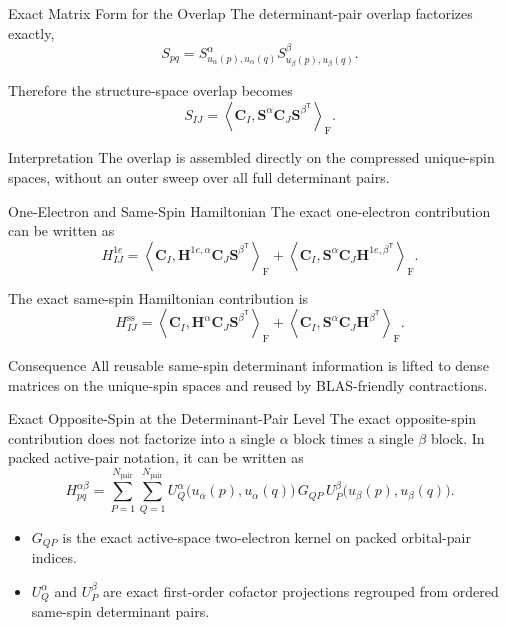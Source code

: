 \documentclass{beamer}
\newcommand{\Frob}[2]{\left\langle #1, #2 \right\rangle_{\mathrm F}}
\newcommand{\Npair}{N_{\mathrm{pair}}}
\newcommand{\Cmat}{\mathbf{C}}
\newcommand{\Sa}{\mathbf{S}^{\alpha}}
\newcommand{\Sb}{\mathbf{S}^{\beta}}
\newcommand{\Ha}{\mathbf{H}^{\alpha}}
\newcommand{\Hb}{\mathbf{H}^{\beta}}
\newcommand{\Honea}{\mathbf{H}^{1e,\alpha}}
\newcommand{\Honeb}{\mathbf{H}^{1e,\beta}}
\begin{document}
\begin{frame}{Exact Matrix Form for the Overlap}
  The determinant-pair overlap factorizes exactly,
  \[
  S_{pq}
  =
  S^{\alpha}_{u_{\alpha}(p),u_{\alpha}(q)}
  S^{\beta}_{u_{\beta}(p),u_{\beta}(q)}.
  \]

  Therefore the structure-space overlap becomes
  \[
  S_{IJ}
  =
  \Frob{\Cmat_I}{\Sa \Cmat_J \Sb^{\mathsf T}}.
  \]

  \begin{block}{Interpretation}
    The overlap is assembled directly on the compressed unique-spin spaces,
    without an outer sweep over all full determinant pairs.
  \end{block}
\end{frame}

\begin{frame}{One-Electron and Same-Spin Hamiltonian}
  The exact one-electron contribution can be written as
  \[
  H^{1e}_{IJ}
  =
  \Frob{\Cmat_I}{\Honea \Cmat_J \Sb^{\mathsf T}}
  +
  \Frob{\Cmat_I}{\Sa \Cmat_J \Honeb^{\mathsf T}}.
  \]

  The exact same-spin Hamiltonian contribution is
  \[
  H^{\mathrm{ss}}_{IJ}
  =
  \Frob{\Cmat_I}{\Ha \Cmat_J \Sb^{\mathsf T}}
  +
  \Frob{\Cmat_I}{\Sa \Cmat_J \Hb^{\mathsf T}}.
  \]

  \begin{block}{Consequence}
    All reusable same-spin determinant information is lifted to dense matrices
    on the unique-spin spaces and reused by BLAS-friendly contractions.
  \end{block}
\end{frame}

\begin{frame}{Exact Opposite-Spin at the Determinant-Pair Level}
  The exact opposite-spin contribution does not factorize into a single
  $\alpha$ block times a single $\beta$ block. In packed active-pair notation,
  it can be written as
  \[
  H_{pq}^{\alpha\beta}
  =
  \sum_{P=1}^{\Npair}
  \sum_{Q=1}^{\Npair}
  U_Q^\alpha\!\bigl(u_{\alpha}(p),u_{\alpha}(q)\bigr)\,
  G_{QP}\,
  U_P^\beta\!\bigl(u_{\beta}(p),u_{\beta}(q)\bigr).
  \]

  \begin{itemize}
    \item $G_{QP}$ is the exact active-space two-electron kernel on packed
          orbital-pair indices.
    \item $U^\alpha_Q$ and $U^\beta_P$ are exact first-order cofactor
          projections regrouped from ordered same-spin determinant pairs.
  \end{itemize}
\end{frame}
\end{document}

